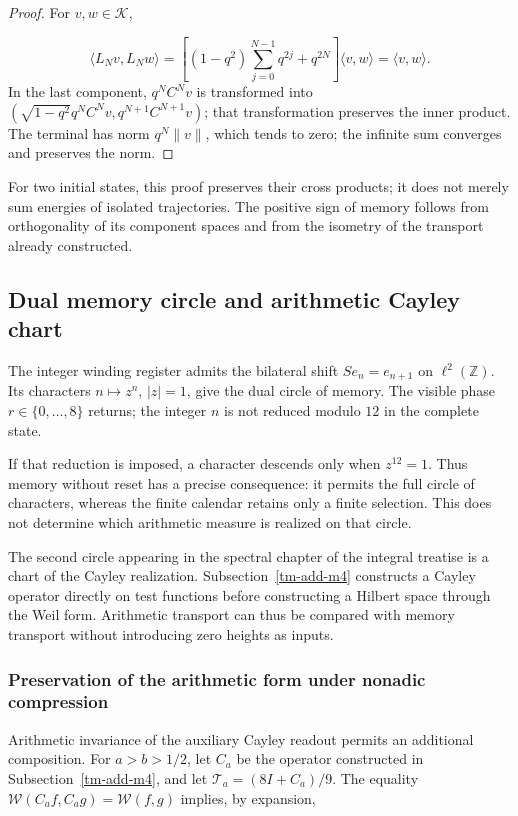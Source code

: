 \begin{proof}
For \(v,w\in\mathcal K\),

\[
\langle L_Nv,L_Nw\rangle
=\left[(1-q^2)\sum_{j=0}^{N-1}q^{2j}+q^{2N}\right]
\langle v,w\rangle=\langle v,w\rangle.
\]
In the last component, \(q^NC^Nv\) is transformed into \((\sqrt{1-q^2}q^NC^Nv,q^{N+1}C^{N+1}v)\); that transformation preserves the inner product. The terminal has norm \(q^N\|v\|\), which tends to zero; the infinite sum converges and preserves the norm.
\end{proof}

For two initial states, this proof preserves their cross products; it does not merely sum energies of isolated trajectories. The positive sign of memory follows from orthogonality of its component spaces and from the isometry of the transport already constructed.


\subsection{Dual memory circle and arithmetic Cayley chart}
\label{tm-add-c4}
The integer winding register admits the bilateral shift \(Se_n=e_{n+1}\) on \(\ell^2(\mathbb Z)\). Its characters \(n\mapsto z^n\), \(|z|=1\), give the dual circle of memory. The visible phase \(r\in\{0,\ldots,8\}\) returns; the integer \(n\) is not reduced modulo \(12\) in the complete state.

If that reduction is imposed, a character descends only when \(z^{12}=1\). Thus memory without reset has a precise consequence: it permits the full circle of characters, whereas the finite calendar retains only a finite selection. This does not determine which arithmetic measure is realized on that circle.

The second circle appearing in the spectral chapter of the integral treatise is a chart of the Cayley realization. Subsection~\ref{tm-add-m4} constructs a Cayley operator directly on test functions before constructing a Hilbert space through the Weil form. Arithmetic transport can thus be compared with memory transport without introducing zero heights as inputs.


\subsubsection{Preservation of the arithmetic form under nonadic compression}
\label{tm-add-c4-1}
Arithmetic invariance of the auxiliary Cayley readout permits an additional composition. For \(a>b>1/2\), let \(C_a\) be the operator constructed in Subsection~\ref{tm-add-m4}, and let \(\mathcal T_a=(8I+C_a)/9\). The equality \(\mathscr W(C_af,C_ag)=\mathscr W(f,g)\) implies, by expansion,


